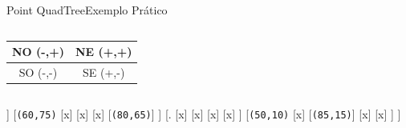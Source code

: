 \documentclass[red, tikz, aspectratio=169, xcolor=dvipsnames]{beamer}
\begin{document}
			\begin{frame}[fragile]{Point QuadTree}{Exemplo Prático}
				\centering
				\vspace{-40px}
				\begin{columns}
					\begin{column}{0.48\textwidth}
						\centering
						\begin{tabular}{|c|c|}
							\hline 
							NO (-,+) & NE (+,+) \\ 
							\hline 
							SO (-,-) & SE (+,-) \\ 
							\hline 
						\end{tabular} 
					\end{column}
					\begin{column}{0.5\textwidth}
						\centering
						\fbox{
							\begin{forest}
								[\texttt{(x,y)}
								[NO]
								[NE]
								[SO]
								[SE]
								]
						\end{forest}}
					\end{column}
				\end{columns}
				\vspace{10px}
				
				\vspace{10px}
				
				\begin{minipage}{\textwidth}
					\centering
					
					\begin{forest}
						[\texttt{(35,40)}
						[.
						[x]
						[x]
						[x]
						[x]
						]
						[\texttt{(60,75)}
						[x]
						[x]
						[x]
						[\texttt{(80,65)}]
						]
						[.
						[x]
						[x]
						[x]
						[x]
						]
						[\texttt{(50,10)}
						[x]
						[\texttt{(85,15)}]
						[x]
						[x]
						]
						]
					\end{forest}
				\end{minipage}
			\end{frame}
			
\end{document}
